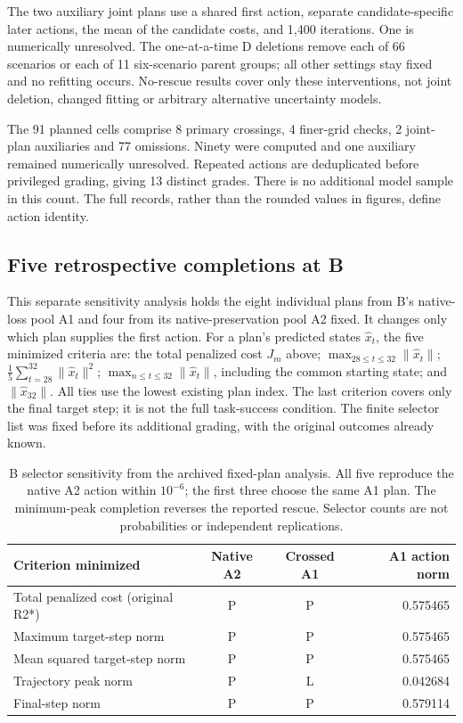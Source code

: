 The two auxiliary joint plans use a shared first action, separate candidate-specific later actions, the mean of the candidate costs, and 1,400 iterations. One is numerically unresolved. The one-at-a-time D deletions remove each of 66 scenarios or each of 11 six-scenario parent groups; all other settings stay fixed and no refitting occurs. No-rescue results cover only these interventions, not joint deletion, changed fitting or arbitrary alternative uncertainty models.

The 91 planned cells comprise 8 primary crossings, 4 finer-grid checks, 2 joint-plan auxiliaries and 77 omissions. Ninety were computed and one auxiliary remained numerically unresolved. Repeated actions are deduplicated before privileged grading, giving 13 distinct grades. There is no additional model sample in this count. The full records, rather than the rounded values in figures, define action identity.

\subsection{Five retrospective completions at B}
\label{app:b-completions}
This separate sensitivity analysis holds the eight individual plans from
B's native-loss pool A1 and four from its native-preservation pool A2 fixed.
It changes only which plan
supplies the first action. For a plan's predicted states $\hat x_t$, the
five minimized criteria are: the total penalized cost $J_m$ above;
$\max_{28\leq t\leq32}\|\hat x_t\|$;
$\tfrac15\sum_{t=28}^{32}\|\hat x_t\|^2$;
$\max_{n\leq t\leq32}\|\hat x_t\|$, including the common starting state;
and $\|\hat x_{32}\|$. All ties use the lowest existing plan index.
The last criterion covers only the final target step; it is not the full
task-success condition. The finite selector list was fixed before its
additional grading, with the original outcomes already known.

\begin{table}[htbp]
\centering\small
\begin{tabular}{lccr}\toprule
Criterion minimized & Native A2 & Crossed A1 & A1 action norm\\\midrule
Total penalized cost (original R2*) & P & P & 0.575465\\
Maximum target-step norm & P & P & 0.575465\\
Mean squared target-step norm & P & P & 0.575465\\
Trajectory peak norm & P & L & 0.042684\\
Final-step norm & P & P & 0.579114\\\bottomrule
\end{tabular}
\caption{B selector sensitivity from the archived fixed-plan analysis.
All five reproduce the native A2 action within $10^{-6}$; the first three
choose the same A1 plan. The minimum-peak completion reverses the reported
rescue. Selector counts are not probabilities or independent replications.}
\label{tab:b-completions}
\end{table}

